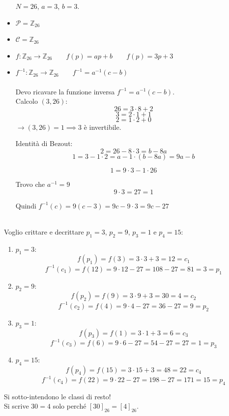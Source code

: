 \documentclass[a4paper,12pt, oneside]{book}
\begin{document}
		\begin{shaded}
			\begin{esempio}
				\begin{itemize} $N = 26$, $a=3$, $b=3$.
					\item $\mathcal{P} = \mathbb{Z}_{26}$
					\item $\mathcal{C} = \mathbb{Z}_{26}$
					\item $f: \mathbb{Z}_{26} \rightarrow \mathbb{Z}_{26} \qquad f(p) = ap+b \qquad f(p) = 3p+3$
					\item $f^{-1}: \mathbb{Z}_{26} \rightarrow \mathbb{Z}_{26} \qquad f^{-1} = a^{-1} (c-b)$\\\\
						Devo ricavare la funzione inversa $f^{-1} = a^{-1} (c-b)$.\\
						Calcolo $(3, 26)$:
							$$26 = 3 \cdot 8 + 2$$
							$$3 = 2 \cdot 1 + 1$$
							$$2 = 1 \cdot 2 + 0$$
						$\rightarrow (3, 26) = 1 \implies 3$ è invertibile.
						
						Identità di Bezout: 
							$$2 = 26 - 8 \cdot 3 = b - 8a$$
							$$1 = 3  - 1 \cdot 2 = a - 1 \cdot (b-8a) = 9a-b$$
							
							$$1 = 9 \cdot 3 - 1 \cdot 26$$
						
						Trovo che $a^{-1} = 9$
						$$9 \cdot 3 = 27 = 1$$
						
						Quindi $f^{-1}(c) = 9 (c-3) = 9c -9 \cdot 3 = 9c -27$\\\\						
				\end{itemize}
				
				Voglio crittare e decrittare $p_1=3$, $p_2=9$, $p_3=1$ e $p_4=15$:
				\begin{enumerate}
					\item $p_1 = 3$:\\
						$$f(p_1) = f(3) = 3 \cdot 3 + 3 = 12 = c_1$$
						$$f^{-1}(c_1) = f(12) = 9 \cdot 12 - 27 = 108 - 27 = 81 = 3 = p_1$$
					\item $p_2 = 9$:\\
						$$f(p_2) = f(9) = 3 \cdot 9 + 3 = 30 = 4 = c_2$$
						$$f^{-1}(c_2) = f(4) = 9 \cdot 4 - 27 = 36 - 27 = 9 = p_2$$
					\item $p_3 = 1$:\\
						$$f(p_3) = f(1) = 3 \cdot 1 + 3 = 6 = c_3$$
						$$f^{-1}(c_3) = f(6) = 9 \cdot 6 - 27 = 54 - 27 = 27 = 1 = p_3$$
					\item $p_4 = 15$:\\
						$$f(p_4) = f(15) = 3 \cdot 15 + 3 = 48 = 22 = c_4$$
						$$f^{-1}(c_4) = f(22) = 9 \cdot 22 - 27 = 198 - 27 = 171 = 15 = p_4$$
				\end{enumerate}

				\begin{nota}
					Si sotto-intendono le classi di resto!\\
					Si scrive $30 = 4$ solo perché $[30]_{26} = [4]_{26}$.
				\end{nota}
				
			\end{esempio}
		\end{shaded}
		
\end{document}
